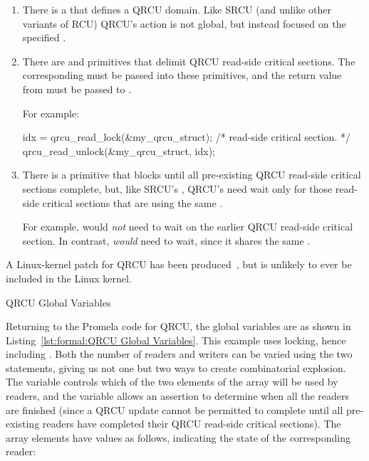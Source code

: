\begin{enumerate}
\item	There is a  that defines a QRCU domain.
	Like SRCU (and unlike other variants of RCU) QRCU's action
	is not global, but instead focused on the specified
	.
\item	There are  and 
	primitives that delimit QRCU read-side critical sections.
	The corresponding  must be passed into
	these primitives, and the return value from 
	must be passed to .

	For example:

\begin{VerbatimU}
idx = qrcu_read_lock(&my_qrcu_struct);
/* read-side critical section. */
qrcu_read_unlock(&my_qrcu_struct, idx);
\end{VerbatimU}

\item	There is a  primitive that blocks until
	all pre-existing QRCU read-side critical sections complete,
	but, like SRCU's , QRCU's
	 need wait only for those read-side
	critical sections that are using the same .

	For example, 
	would \emph{not} need to wait on the earlier QRCU read-side
	critical section.
	In contrast, 
	\emph{would} need to wait, since it shares the same
	.
\end{enumerate}

A Linux-kernel patch for QRCU has been
produced~\cite{PaulMcKenney2007QRCUpatch},
but is unlikely to ever be included in the Linux kernel.

\begin{listing}[htbp]

\caption{QRCU Global Variables}
\label{lst:formal:QRCU Global Variables}
\end{listing}

Returning to the Promela code for QRCU, the global variables are as shown in
Listing~\ref{lst:formal:QRCU Global Variables}.
This example uses locking, hence including .
Both the number of readers and writers can be varied using the
two  statements, giving us not one but two ways to create
combinatorial explosion.
The  variable controls which of the two elements of the 
array will be used by readers, and the  variable
allows an assertion to determine when all the readers are finished
(since a QRCU update cannot be permitted to complete until all
pre-existing readers have completed their QRCU read-side critical
sections).
The  array elements have values as follows,
indicating the state of the corresponding reader:

